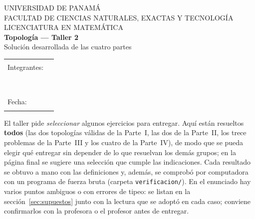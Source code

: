 \documentclass[11pt]{article}
\begin{document}
\thispagestyle{empty}
\begin{center}
{\sffamily\large UNIVERSIDAD DE PANAMÁ\\[1pt] FACULTAD DE CIENCIAS NATURALES, EXACTAS Y TECNOLOGÍA\\[1pt] LICENCIATURA EN MATEMÁTICA}\\[1.6em]
{\sffamily\bfseries\Huge\color{tinta} Topología — Taller 2}\\[0.5em]
{\sffamily\Large Solución desarrollada de las cuatro partes}\\[1.4em]
\begin{tabular}{@{}ll@{}}
\sffamily Integrantes: & \rule{7.2cm}{0.4pt}\\[0.9em]
 & \rule{7.2cm}{0.4pt}\\[0.9em]
\sffamily Fecha: & \rule{4cm}{0.4pt}
\end{tabular}
\end{center}
\vspace{0.6em}

\begin{ojo}
El taller pide \emph{seleccionar} algunos ejercicios para entregar. Aquí están resueltos \textbf{todos} (las dos
topologías válidas de la Parte~I, las dos de la Parte~II, los trece problemas de la Parte~III y los cuatro de la
Parte~IV), de modo que se pueda elegir qué entregar sin depender de lo que resuelvan los demás grupos; en la
página final se sugiere una selección que cumple las indicaciones. Cada resultado se obtuvo a mano con las
definiciones y, además, se comprobó por computadora con un programa de fuerza bruta (carpeta
\texttt{verificacion/}). En el enunciado hay varios puntos ambiguos o con errores de tipeo: se listan en la
sección~\ref{sec:supuestos} junto con la lectura que se adoptó en cada caso; conviene confirmarlos con la profesora o
el profesor antes de entregar.
\end{ojo}

\setcounter{tocdepth}{1}
{\small\tableofcontents}
\newpage







\end{document}
